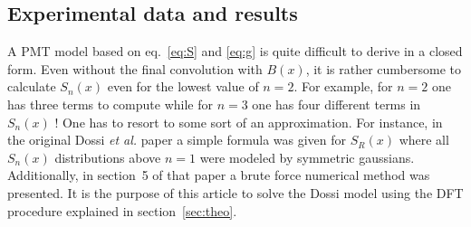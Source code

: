 \documentclass[a4paper,11pt]{article}
\begin{document}
\subsection{Experimental data and results}
%

A PMT model based on eq.~\eqref{eq:S} and \eqref{eq:g} is quite difficult to derive in a closed form.
Even without the final convolution with $B(x)$, it is rather cumbersome to calculate $S_n(x)$ even for the lowest value of $n=2$. 
For example, for $n=2$ one has three terms to compute while for $n=3$ one has four different terms in $S_n(x)$ ! 
One has to resort to some sort of an approximation. 
For instance, in the original Dossi \emph{et al.} paper a simple formula was given for $S_R(x)$ where all $S_n(x)$ distributions above $n=1$ were modeled by symmetric gaussians. 
Additionally, in section~5 of that paper a brute force numerical method was presented. 
It is the purpose of this article to solve the Dossi model using the DFT procedure explained in section~\ref{sec:theo}. 
\end{document}
